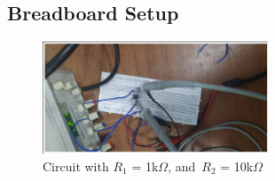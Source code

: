 \documentclass{article}
\begin{document}
\subsection{Breadboard Setup}
\begin{figure}[h!]
\centering
    \includegraphics[width=0.6\textwidth]{i11.png}
    \caption{Circuit with $R_{1}$ = 1k$\Omega$, \textrm{and}\, $R_{2}$ = 10k$\Omega$}
\end{figure}
\end{document}
